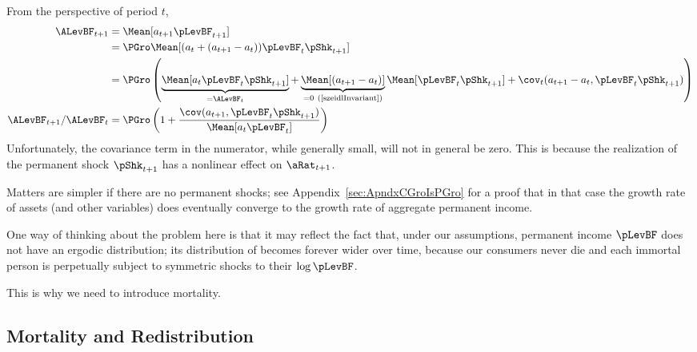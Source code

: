 \documentclass[BufferStockTheory]{subfiles}
\begin{document}
From the perspective of period $t$, %
\begin{align*}
  \ALevBF_{t+1} & = \Mean[a_{t+1} \pLevBF_{t+1}]
  \\              & = \PGro \Mean[(a_{t}+(a_{t+1}-a_{t}))\pLevBF_{t}\pShk_{t+1}]
  \\              & = \PGro \left(\underbrace{\Mean[a_{t}\pLevBF_{t}\pShk_{t+1}]}_{=\ALevBF_{t}}+\underbrace{\Mean[(a_{t+1}-a_{t})]}_{=0~(\text{\cite{szeidlInvariant})}}\Mean[\pLevBF_{t}\pShk_{t+1}]+\cov_{t}(a_{t+1}-a_{t},\pLevBF_{t}\pShk_{t+1})\right)
  \\ \ALevBF_{t+1}/\ALevBF_{t}                    & = \PGro \left(1+\frac{\cov(a_{t+1},\pLevBF_{t}\pShk_{t+1})}{\Mean[a_{t}\pLevBF_{t}]}\right)
\end{align*}
Unfortunately, the covariance term in the numerator, while generally small, will not in general be zero.  This is because the realization of the permanent shock $\pShk_{t+1}$ has a nonlinear effect on $\aRat_{t+1}$.
\begin{comment}
\begin{align}
  \aFunc(\mRat_{t+1}) & \approx \aFunc(\mRat_{t})+\aFunc^{\prime}(\mRat_{t})(m_{t+1}-\mRat_{t})
\\ \cov_{t}(a_{t+1}-a_{t},\pLevBF_{t}\pShk_{t+1}) & \approx \cov_{t}\left( \aFunc^{\prime}(\mRat_{t})(m_{t+1}-\mRat_{t}),\pShk_{t+1} \pLevBF_{t})
\end{align}
\end{comment}
Matters are simpler if there are no permanent shocks; see Appendix~\ref{sec:ApndxCGroIsPGro} for a proof that in that case the growth rate of assets (and other variables) does eventually converge to the growth rate of aggregate permanent income.

One way of thinking about the problem here is that it may reflect the fact that, under our assumptions, permanent income $\pLevBF$ does not have an ergodic distribution; its distribution of becomes forever wider over time, because our consumers never die and each immortal person is perpetually subject to symmetric shocks to their $\log \pLevBF$.

This is why we need to introduce mortality.


\hypertarget{Mortality-And-Redistribution}{}
\subsection{Mortality and Redistribution}\label{sec:Mortality-And-Redistribution}
\end{document}
